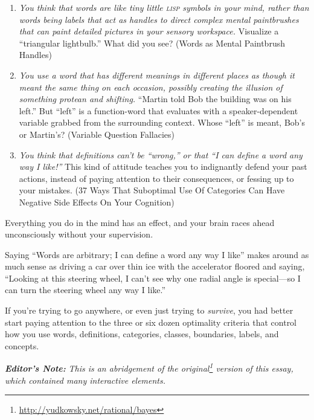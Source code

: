 {\begin{enumerate}
\item {
 \textit{You think that words are like tiny little \textsc{lisp} symbols in
your mind, rather than words being labels that act as handles to direct
complex mental paintbrushes that can paint detailed pictures in your
sensory workspace.} Visualize a ``triangular
lightbulb.'' What did you see? (Words as Mental
Paintbrush Handles)}

\item {
 \textit{You use a word that has different meanings in different
places as though it meant the same thing on each occasion, possibly
creating the illusion of something protean and shifting.}
``Martin told Bob the building was on his
left.'' But
``left'' is a function-word that
evaluates with a speaker-dependent variable grabbed from the
surrounding context. Whose ``left''
is meant, Bob's or Martin's? (Variable
Question Fallacies)}

\item {
 \textit{You think that definitions can't be
``wrong,'' or that
``I can define a word any way I
like!''} This kind of attitude teaches you to
indignantly defend your past actions, instead of paying attention to
their consequences, or fessing up to your mistakes. (37 Ways That
Suboptimal Use Of Categories Can Have Negative Side Effects On Your
Cognition)}
\end{enumerate}


 Everything you do in the mind has an effect, and your brain races
ahead unconsciously without your supervision.


 Saying ``Words are arbitrary; I can define a word
any way I like'' makes around as much sense as
driving a car over thin ice with the accelerator floored and saying,
``Looking at this steering wheel, I
can't see why one radial angle is special---so I can
turn the steering wheel any way I like.''


 If you're trying to go anywhere, or even just
trying to \textit{survive}, you had better start paying attention to
the three or six dozen optimality criteria that control how you use
words, definitions, categories, classes, boundaries, labels, and
concepts.

\myendsectiontext

\label{intuitive_bayesian}

{
\textbf{\textit{Editor's
Note:}}\textit{ This is an abridgement of the
 original\footnote{\url{http://yudkowsky.net/rational/bayes}} version of this essay, which contained many
interactive elements.}}


}
